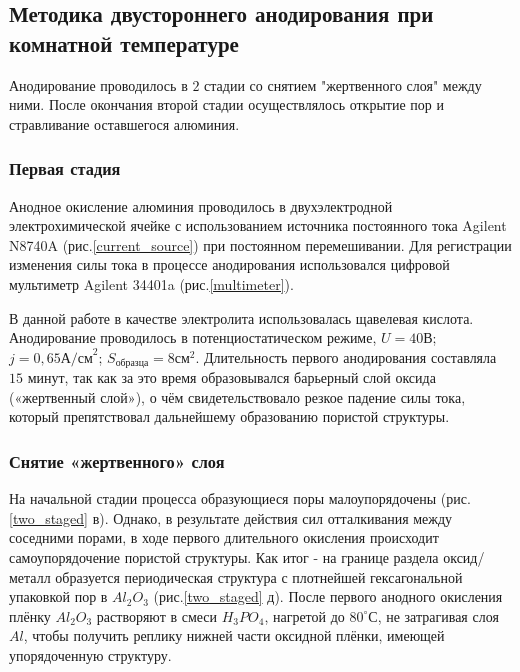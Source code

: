 \subsection{Методика двустороннего анодирования при комнатной температуре}

Анодирование проводилось в $2$ стадии со снятием "жертвенного слоя" между ними. После окончания второй стадии осуществлялось открытие пор и стравливание оставшегося алюминия.

\subsubsection{Первая стадия}

Анодное окисление алюминия проводилось в двухэлектродной электрохимической ячейке с использованием источника постоянного тока Agilent N8740A (рис.\ref{current_source}) при постоянном перемешивании. Для регистрации изменения силы тока в процессе анодирования использовался цифровой мультиметр Agilent 34401a (рис.\ref{multimeter}).



В данной работе в качестве электролита использовалась щавелевая кислота. Анодирование проводилось в потенциостатическом режиме, $U=40\text{В}$; $j=0,65 \text{А/см}^2$; $S_\text{образца} = 8\text{см}^2$. Длительность первого анодирования составляла $15$ минут, так как за это время образовывался барьерный слой оксида («жертвенный слой»), о чём свидетельствовало резкое падение силы тока, который препятствовал дальнейшему образованию пористой структуры.

\subsubsection{Снятие «жертвенного» слоя}

На начальной стадии процесса образующиеся поры малоупорядочены (рис.\ref{two_staged} в). Однако, в результате действия сил отталкивания между соседними порами, в ходе первого длительного окисления происходит самоупорядочение пористой структуры. Как итог -  на границе раздела оксид/металл образуется периодическая структура с плотнейшей гексагональной упаковкой пор в $Al_2O_3$ (рис.\ref{two_staged} д). После первого анодного окисления плёнку $Al_2O_3$ растворяют в смеси $H_3PO_4$, нагретой до $80^{\circ}С$, не затрагивая слоя $Al$, чтобы получить реплику нижней части оксидной плёнки, имеющей упорядоченную структуру.

